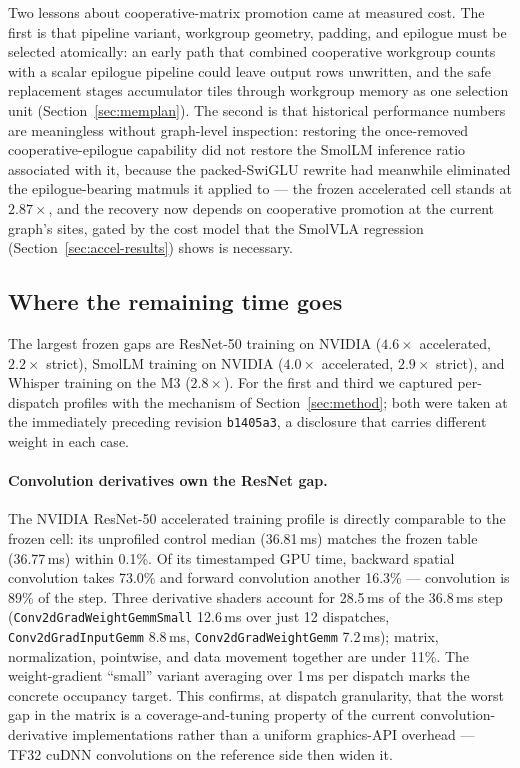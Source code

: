 \documentclass[10pt,twocolumn]{article}
\newcommand{\code}[1]{\texttt{#1}}
\begin{document}
Two lessons about cooperative-matrix promotion came at measured cost. The
first is that pipeline variant, workgroup geometry, padding, and epilogue
must be selected atomically: an early path that combined cooperative
workgroup counts with a scalar epilogue pipeline could leave output rows
unwritten, and the safe replacement stages accumulator tiles through
workgroup memory as one selection unit (Section~\ref{sec:memplan}). The
second is that historical performance numbers are meaningless without
graph-level inspection: restoring the once-removed cooperative-epilogue
capability did not restore the SmolLM inference ratio associated with it,
because the packed-SwiGLU rewrite had meanwhile eliminated the
epilogue-bearing matmuls it applied to --- the frozen accelerated cell
stands at $2.87\times$, and the recovery now depends on cooperative
promotion at the current graph's sites, gated by the cost model that the
SmolVLA regression (Section~\ref{sec:accel-results}) shows is necessary.

\subsection{Where the remaining time goes}
\label{sec:gaps}

The largest frozen gaps are ResNet-50 training on NVIDIA ($4.6\times$
accelerated, $2.2\times$ strict), SmolLM training on NVIDIA ($4.0\times$
accelerated, $2.9\times$ strict), and Whisper training on the M3
($2.8\times$). For the first and third we captured per-dispatch profiles
with the mechanism of Section~\ref{sec:method}; both were taken at the
immediately preceding revision \code{b1405a3}, a disclosure that carries
different weight in each case.

\paragraph{Convolution derivatives own the ResNet gap.}
The NVIDIA ResNet-50 accelerated training profile is directly comparable to
the frozen cell: its unprofiled control median (36.81\,ms) matches the
frozen table (36.77\,ms) within 0.1\%. Of its timestamped GPU time,
backward spatial convolution takes 73.0\% and forward convolution another
16.3\% --- convolution is 89\% of the step. Three derivative shaders
account for 28.5\,ms of the 36.8\,ms step
(\code{Conv2dGradWeightGemmSmall} 12.6\,ms over just 12 dispatches,
\code{Conv2dGradInputGemm} 8.8\,ms, \code{Conv2dGradWeightGemm} 7.2\,ms);
matrix, normalization, pointwise, and data movement together are under
11\%. The weight-gradient ``small'' variant averaging over 1\,ms per
dispatch marks the concrete occupancy target. This confirms, at dispatch
granularity, that the worst gap in the matrix is a coverage-and-tuning
property of the current convolution-derivative implementations rather than a
uniform graphics-API overhead --- TF32 cuDNN convolutions on the reference
side then widen it.
\end{document}

